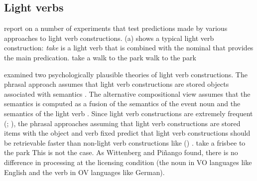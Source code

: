 \begin{exe}
\begin{xlist}[iv.]
\begin{exe}
\begin{xlist}[iv.]
\subsection{Light verbs}
\label{sec-psycho-lv}

\citet*{WJKP2014a} report on a number of experiments that test predictions made by
various approaches to light verb constructions. (a) shows a typical light verb construction:
\emph{take} is a light verb that is combined with the nominal that provides the main
predication. 
\eal
\ex take a walk to the park
\ex walk to the park
\zl

\citet{WP2011a} examined two psychologically plausible theories of light verb constructions.  The phrasal approach 
 assumes that light verb constructions are stored objects associated with semantics \citep{Goldberg2003a}.
The alternative compositional view assumes that the semantics is computed as a fusion of the
semantics of the event noun and the semantics of the
light verb \citep{Grimshaw97a-u,Butt2003a-u,Jackendoff2002a-u,CJ2005a,MuellerPersian,BPW2008a-u}.  
Since light verb constructions are extremely frequent (\citealp*{Pinango:2006qy};
\citealp[]{WP2011a}), the phrasal approaches assuming that
light verb constructions are stored items with the object and verb fixed predict that light verb
constructions should be retrievable faster than non-light verb constructions like () \citep[]{WP2011a}. 
\ea
take a frisbee to the park
\z
This is not the case. As Wittenberg and Piñango found, there is no difference in processing at the licensing
condition (the noun in VO languages like English and the verb in OV languages like German). 



\end{xlist}
\end{exe}
\end{xlist}
\end{exe}
